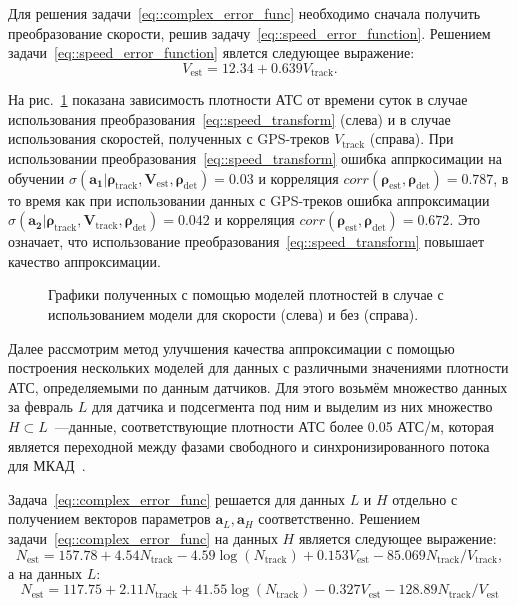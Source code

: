 Для решения задачи~\eqref{eq::complex_error_func} необходимо сначала получить преобразование скорости, решив задачу~\eqref{eq::speed_error_function}.
Решением задачи~\eqref{eq::speed_error_function} явлется следующее выражение:
\begin{equation}
    V_\text{est} = 12.34 + 0.639V_\text{track}.
    \label{eq::speed_transform}
\end{equation}

На рис.~\ref{fig:with_without_V} показана зависимость плотности АТС от времени суток в случае использования преобразования~\eqref{eq::speed_transform} (слева) и в случае использования скоростей, полученных с GPS-треков $V_\text{track}$ (справа).
При использовании преобразования~\eqref{eq::speed_transform} ошибка аппркосимации на обучении $\sigma(\mathbf{a_1}|\mathbf{\rho}_\text{track}, \mathbf{V}_\text{est}, \mathbf{\rho}_\text{det}) = 0.03$ и корреляция $corr(\mathbf{\rho}_\text{est}, \mathbf{\rho}_\text{det}) = 0.787$, в то время как при использовании данных с GPS-треков ошибка аппроксимации $\sigma(\mathbf{a_2}|\mathbf{\rho}_\text{track}, \mathbf{V}_\text{track}, \mathbf{\rho}_\text{det}) = 0.042$ и корреляция $corr(\mathbf{\rho}_\text{est}, \mathbf{\rho}_\text{det}) = 0.672$.
Это означает, что использование преобразования~\eqref{eq::speed_transform} повышает качество аппроксимации.

\begin{figure}[!ht]
\caption{Графики полученных с помощью моделей плотностей в случае с использованием модели для скорости (слева) и без (справа).}
\label{fig:with_without_V}
\end{figure}

Далее рассмотрим метод улучшения качества аппроксимации с помощью построения нескольких моделей для данных с различными значениями плотности АТС, определяемыми по данным датчиков.
Для этого возьмём множество данных за февраль $L$ для датчика и подсегмента под ним и выделим из них множество $H \subset L$~---данные, соответствующие плотности АТС более 0.05 АТС/м, которая является переходной между фазами свободного и синхронизированного потока для МКАД~\cite{collectiveArticle}.

Задача~\eqref{eq::complex_error_func} решается для данных $L$ и $H$ отдельно с получением векторов параметров $\mathbf{a}_L, \mathbf{a}_H$ соответственно.
Решением задачи~\eqref{eq::complex_error_func} на данных $H$ является следующее выражение:
\begin{equation}
    N_\text{est} = 157.78 + 4.54N_\text{track} - 4.59\log(N_\text{track}) + 0.153V_\text{est} - 85.069N_\text{track}/V_\text{track},
    \label{eq::model_high}
\end{equation}
а на данных $L$:
\begin{equation}
    N_\text{est} = 117.75 + 2.11N_\text{track} + 41.55\log(N_\text{track}) - 0.327V_\text{est} - 128.89N_\text{track}/V_\text{est}
    \label{eq::model_all}
\end{equation}

